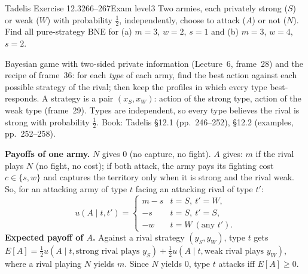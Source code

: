 \begin{exsol}{Tadelis Exercise 12.3}{266--267}{Exam level}{3}
\asked Two armies, each privately strong ($S$) or weak ($W$) with probability $\frac12$,
independently, choose to attack ($A$) or not ($N$). Find all pure-strategy BNE for (a) $m = 3$,
$w = 2$, $s = 1$ and (b) $m = 3$, $w = 4$, $s = 2$.

\method Bayesian game with two-sided private information (Lecture~6, frame~28) and the recipe of
frame~36: for each \emph{type} of each army, find the best action against each possible strategy of
the rival; then keep the profiles in which every type best-responds. A strategy is a pair
$(x_S, x_W)$: action of the strong type, action of the weak type (frame~29). Types are independent, so
every type believes the rival is strong with probability $\frac12$. Book: Tadelis \S12.1 (pp.~246--252),
\S12.2 (examples, pp.~252--258).

\solution
\textbf{Payoffs of one army.} $N$ gives $0$ (no capture, no fight). $A$ gives: $m$ if the rival plays
$N$ (no fight, no cost); if both attack, the army pays its fighting cost $c \in \{s, w\}$ and captures
the territory only when it is strong and the rival weak. So, for an attacking army of type $t$ facing an
attacking rival of type $t'$:
\[
  u(A \mid t, t') = \begin{cases} m - s & t = S,\ t' = W,\\ -s & t = S,\ t' = S,\\ -w & t = W
  \ (\text{any } t'). \end{cases}
\]
\textbf{Expected payoff of $A$.} Against a rival strategy $(y_S, y_W)$, type $t$ gets
$E[A] = \frac12 u(A \mid t, \text{strong rival plays } y_S) + \frac12 u(A \mid t, \text{weak rival plays }
y_W)$, where a rival playing $N$ yields $m$. Since $N$ yields $0$, type $t$ attacks iff $E[A] \ge 0$.


\end{exsol}
